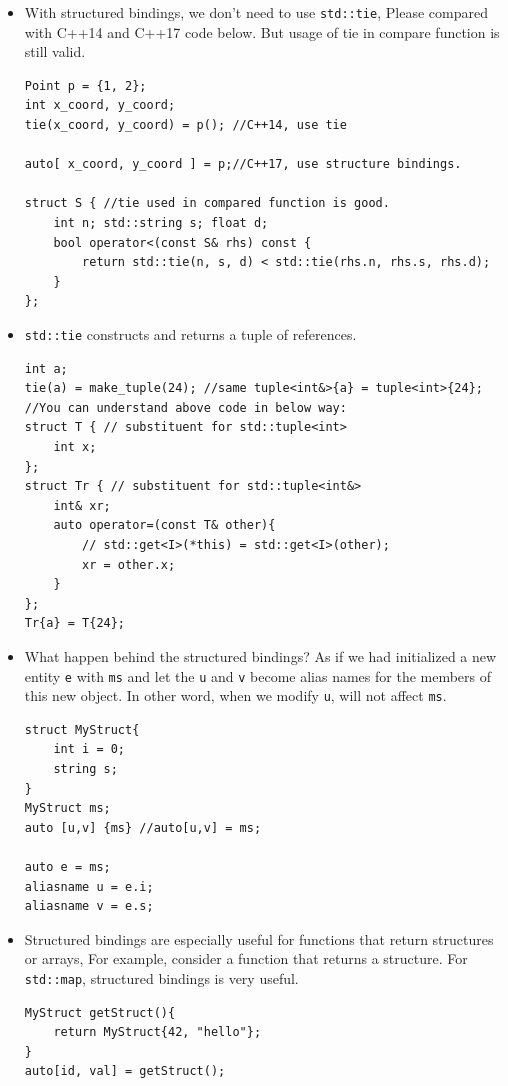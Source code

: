\documentclass[a4paper,11pt,twoside]{book}
\begin{document}
\begin{itemize}
    \item With structured bindings, we don't need to use \texttt{std::tie}, Please compared with C++14 and C++17 code below. But usage of tie in compare function is still valid.

\begin{lstlisting}
Point p = {1, 2};
int x_coord, y_coord;
tie(x_coord, y_coord) = p(); //C++14, use tie

auto[ x_coord, y_coord ] = p;//C++17, use structure bindings. 

struct S { //tie used in compared function is good.
    int n; std::string s; float d;
    bool operator<(const S& rhs) const {
        return std::tie(n, s, d) < std::tie(rhs.n, rhs.s, rhs.d);
    }
};
\end{lstlisting}

	\item \texttt{std::tie} constructs and returns a tuple of references.
\begin{lstlisting}
int a;
tie(a) = make_tuple(24); //same tuple<int&>{a} = tuple<int>{24};
//You can understand above code in below way:
struct T { // substituent for std::tuple<int>
	int x;
};
struct Tr { // substituent for std::tuple<int&>
	int& xr;	
	auto operator=(const T& other){
		// std::get<I>(*this) = std::get<I>(other);
		xr = other.x;
	}
};
Tr{a} = T{24};
\end{lstlisting}

	\item What happen behind the structured bindings? As if we had initialized a new entity \texttt{e} with \texttt{ms} and let the \texttt{u} and \texttt{v} become alias names for the members of this new object. In other word, when we modify \texttt{u}, will not affect \texttt{ms}.

\begin{lstlisting}
struct MyStruct{
	int i = 0;
	string s;
}
MyStruct ms;
auto [u,v] {ms} //auto[u,v] = ms;	

auto e = ms;
aliasname u = e.i;
aliasname v = e.s;	
\end{lstlisting}

	\item Structured bindings are especially useful for functions that return structures or arrays, For example, consider a function that returns a structure. For \texttt{std::map}, structured bindings is very useful.
	
\begin{lstlisting}
MyStruct getStruct(){
	return MyStruct{42, "hello"};
}	
auto[id, val] = getStruct();


\end{lstlisting}
\end{itemize}
\end{document}
